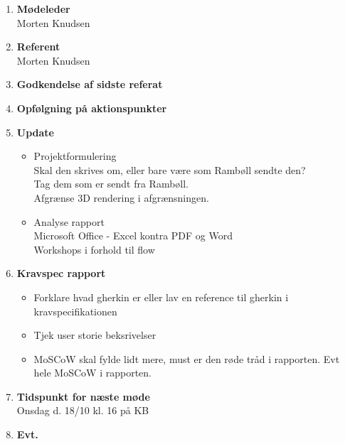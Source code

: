 	\begin{enumerate}
		\itemsep 0.3em 
		\item \textbf{Mødeleder}\\
			Morten Knudsen
		\item \textbf{Referent}\\
			Morten Knudsen
		\item \textbf{Godkendelse af sidste referat}
			
		\item\textbf{Opfølgning på aktionspunkter}

		\item \textbf{Update}
			\begin{itemize}[-]
				\item Projektformulering \\
				Skal den skrives om, eller bare være som Rambøll sendte den? \\
				Tag dem som er sendt fra Rambøll. \\
				Afgrænse 3D rendering i afgrænsningen. \\
				
				\item Analyse rapport \\
				Microsoft Office - Excel kontra PDF og Word \\
				Workshops i forhold til flow
			\end{itemize}
	
		\item \textbf{Kravspec rapport}
		\begin{itemize}[-]
			\item Forklare hvad gherkin er eller lav en reference til gherkin i kravspecifikationen
			\item Tjek user storie beksrivelser
			\item MoSCoW skal fylde lidt mere, must er den røde tråd i rapporten. Evt hele MoSCoW i rapporten.
		\end{itemize}
	
		\item \textbf{Tidspunkt for næste møde} \\
			Onsdag d. 18/10 kl. 16 på KB
			
		\item \textbf{Evt.}
			
	\end{enumerate}
